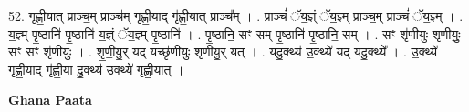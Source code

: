 \documentclass[17pt]{extarticle}
\begin{document}
52. गृ॒ह्णी॒यात् प्राञ्च॒म् प्राञ्च॑म् गृह्णी॒याद् गृ॑ह्णी॒यात् प्राञ्च᳚म् । . प्राञ्चं॑ ॅय॒ज्ञ्ं ॅय॒ज्ञ्म् प्राञ्च॒म् प्राञ्चं॑ ॅय॒ज्ञ्म् । . य॒ज्ञ्म् पृ॒ष्ठानि॑ पृ॒ष्ठानि॑ य॒ज्ञ्ं ॅय॒ज्ञ्म् पृ॒ष्ठानि॑ । . पृ॒ष्ठानि॒ सꣳ सम् पृ॒ष्ठानि॑ पृ॒ष्ठानि॒ सम् । . सꣳ शृ॑णीयुः शृणीयुः॒ सꣳ सꣳ शृ॑णीयुः । . शृ॒णी॒यु॒र् यद् यच्छृ॑णीयुः शृणीयु॒र् यत् । . यदु॒क्थ्य॑ उ॒क्थ्ये॑ यद् यदु॒क्थ्ये᳚ । . उ॒क्थ्ये॑ गृह्णी॒याद् गृ॑ह्णी॒या दु॒क्थ्य॑ उ॒क्थ्ये॑ गृह्णी॒यात् । \newline

\textbf{Ghana Paata } \newline
\end{document}
